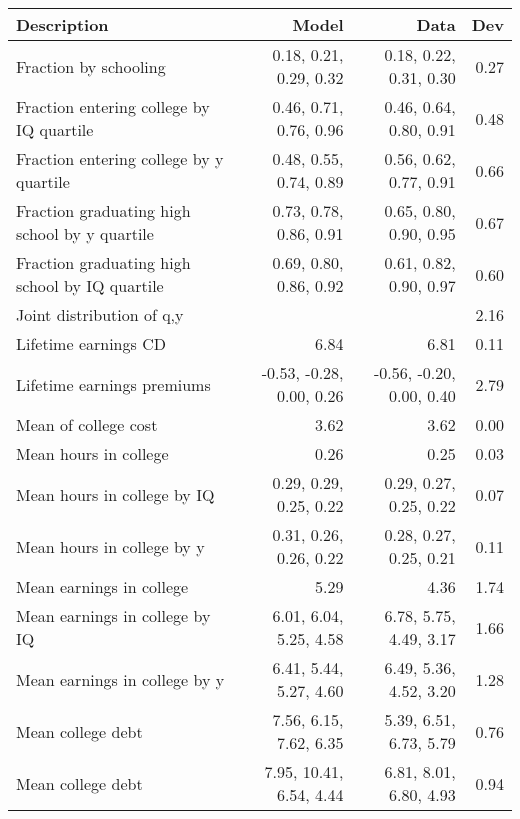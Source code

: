 \begin{tabular}{lrrr}
\hline
Description & Model  & Data  & Dev  \\ 
\hline
Fraction by schooling & 0.18, 0.21, 0.29, 0.32  & 0.18, 0.22, 0.31, 0.30  & 0.27  \\ 
Fraction entering college by IQ quartile & 0.46, 0.71, 0.76, 0.96  & 0.46, 0.64, 0.80, 0.91  & 0.48  \\ 
Fraction entering college by y quartile & 0.48, 0.55, 0.74, 0.89  & 0.56, 0.62, 0.77, 0.91  & 0.66  \\ 
Fraction graduating high school by y quartile & 0.73, 0.78, 0.86, 0.91  & 0.65, 0.80, 0.90, 0.95  & 0.67  \\ 
Fraction graduating high school by IQ quartile & 0.69, 0.80, 0.86, 0.92  & 0.61, 0.82, 0.90, 0.97  & 0.60  \\ 
Joint distribution of q,y &   &   & 2.16  \\ 
Lifetime earnings CD & 6.84  & 6.81  & 0.11  \\ 
Lifetime earnings premiums & -0.53, -0.28, 0.00, 0.26  & -0.56, -0.20, 0.00, 0.40  & 2.79  \\ 
Mean of college cost & 3.62  & 3.62  & 0.00  \\ 
Mean hours in college & 0.26  & 0.25  & 0.03  \\ 
Mean hours in college by IQ & 0.29, 0.29, 0.25, 0.22  & 0.29, 0.27, 0.25, 0.22  & 0.07  \\ 
Mean hours in college by y & 0.31, 0.26, 0.26, 0.22  & 0.28, 0.27, 0.25, 0.21  & 0.11  \\ 
Mean earnings in college & 5.29  & 4.36  & 1.74  \\ 
Mean earnings in college by IQ & 6.01, 6.04, 5.25, 4.58  & 6.78, 5.75, 4.49, 3.17  & 1.66  \\ 
Mean earnings in college by y & 6.41, 5.44, 5.27, 4.60  & 6.49, 5.36, 4.52, 3.20  & 1.28  \\ 
Mean college debt & 7.56, 6.15, 7.62, 6.35  & 5.39, 6.51, 6.73, 5.79  & 0.76  \\ 
Mean college debt & 7.95, 10.41, 6.54, 4.44  & 6.81, 8.01, 6.80, 4.93  & 0.94  \\ 
\hline
\end{tabular}%
